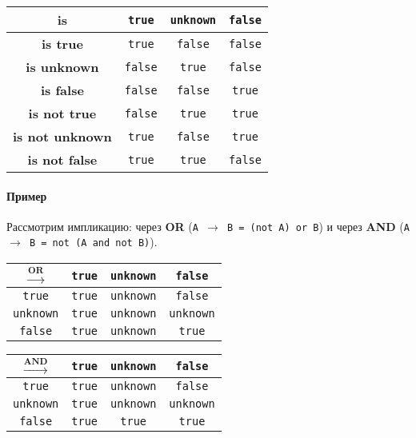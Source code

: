 \begin{center}
	\begin{tabular}{|c||c|c|c|}
		\hline
		\textbf{is}             & \texttt{true}  & \texttt{unknown} & \texttt{false} \\
		\hline
		\hline
		\textbf{is true}        & \texttt{true}  & \texttt{false}   & \texttt{false} \\
		\hline
		\textbf{is unknown}     & \texttt{false} & \texttt{true}    & \texttt{false} \\
		\hline
		\textbf{is false}       & \texttt{false} & \texttt{false}   & \texttt{true}  \\
		\hline
		\textbf{is not true}    & \texttt{false} & \texttt{true}    & \texttt{true}  \\
		\hline
		\textbf{is not unknown} & \texttt{true}  & \texttt{false}   & \texttt{true}  \\
		\hline
		\textbf{is not false}   & \texttt{true}  & \texttt{true}    & \texttt{false} \\
		\hline
	\end{tabular}
\end{center}

\paragraph{Пример}

Рассмотрим импликацию: через \textbf{OR} (\texttt{A $\rightarrow$ B = (not A) or B}) и через \textbf{AND} (\texttt{A $\rightarrow$ B = not (A and not B)}).

\begin{center}
	\begin{tabular}{|c||c|c|c|}
		\hline
		$\xrightarrow{\textbf{OR}}$ & \texttt{true} & \texttt{unknown} & \texttt{false}   \\
		\hline
		\hline
		\texttt{true}               & \texttt{true} & \texttt{unknown} & \texttt{false}   \\
		\hline
		\texttt{unknown}            & \texttt{true} & \texttt{unknown} & \texttt{unknown} \\
		\hline
		\texttt{false}              & \texttt{true} & \texttt{unknown} & \texttt{true}    \\
		\hline
	\end{tabular}
\end{center}

\begin{center}
	\begin{tabular}{|c||c|c|c|}
		\hline
		$\xrightarrow{\textbf{AND}}$ & \texttt{true} & \texttt{unknown} & \texttt{false}   \\
		\hline
		\hline
		\texttt{true}                & \texttt{true} & \texttt{unknown} & \texttt{false}   \\
		\hline
		\texttt{unknown}             & \texttt{true} & \texttt{unknown} & \texttt{unknown} \\
		\hline
		\texttt{false}               & \texttt{true} & \texttt{true}    & \texttt{true}    \\
		\hline
	\end{tabular}
\end{center}


